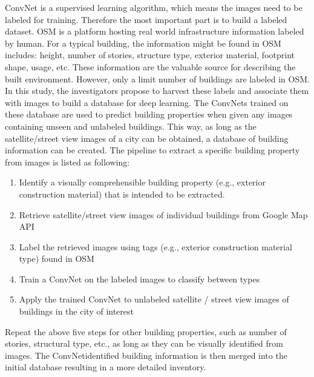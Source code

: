 \documentclass[letterpaper,10pt,english]{sphinxmanual}
\begin{document}
\sphinxAtStartPar
ConvNet is a supervised learning algorithm, which means the images need to be labeled for training.
Therefore the most important part is to build a labeled dataset.
OSM is a platform hosting real world infrastructure information labeled by human.
For a typical building, the information might be found in OSM includes: height, number of stories, structure type,
exterior material, footprint shape, usage, etc. These information are the valuable source for describing the built environment.
However, only a limit number of buildings are labeled in OSM.
In this study, the investigators propose to harvest these labels and associate them with images to build a database for deep learning.
The ConvNets trained on these database are used to predict building properties
when given any images containing unseen and unlabeled buildings.
This way, as long as the satellite/street view images of a city can be obtained,
a database of building information can be created. The pipeline to extract a specific building property
from images is listed as following:
\begin{enumerate}
%
\item {} 
\sphinxAtStartPar
Identify a visually comprehensible building property (e.g., exterior construction material) that is intended to be extracted.

\item {} 
\sphinxAtStartPar
Retrieve satellite/street view images of individual buildings from Google Map API

\item {} 
\sphinxAtStartPar
Label the retrieved images using tags (e.g., exterior construction material type) found in OSM

\item {} 
\sphinxAtStartPar
Train a ConvNet on the labeled images to classify between types

\item {} 
\sphinxAtStartPar
Apply the trained ConvNet to unlabeled satellite / street view images of buildings in the city of interest

\end{enumerate}

\sphinxAtStartPar
Repeat the above five steps for other building properties,
such as number of stories, structural type, etc., as long as they can be visually identified from images.
The ConvNet\sphinxhyphen{}identified building information is then merged into the initial database resulting in a more detailed inventory.
\end{document}
